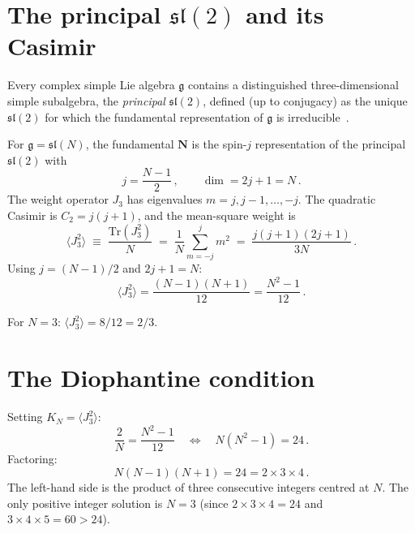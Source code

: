 \documentclass[final,3p,times,twocolumn]{elsarticle}
\newcommand{\Tr}{\mathrm{Tr}}
\begin{document}
\section{The principal $\mathfrak{sl}(2)$ and its Casimir}
\label{sec:sl2}

Every complex simple Lie algebra $\mathfrak{g}$ contains a
distinguished three-dimensional simple subalgebra, the
\emph{principal} $\mathfrak{sl}(2)$, defined (up to conjugacy)
as the unique $\mathfrak{sl}(2)$ for which the fundamental
representation of $\mathfrak{g}$ is
irreducible~\cite{Kostant:1959}.

For $\mathfrak{g} = \mathfrak{sl}(N)$, the fundamental
$\mathbf{N}$ is the spin-$j$ representation of the principal
$\mathfrak{sl}(2)$ with
\begin{equation}
  j = \frac{N-1}{2}\,,\qquad
  \dim = 2j + 1 = N\,.
\end{equation}
The weight operator $J_3$ has eigenvalues
$m = j, j{-}1, \ldots, -j$.
The quadratic Casimir is $C_2 = j(j+1)$, and the
mean-square weight is
\begin{equation}
  \langle J_3^2 \rangle
  \;\equiv\; \frac{\Tr(J_3^2)}{N}
  \;=\; \frac{1}{N}\sum_{m=-j}^{j} m^2
  \;=\; \frac{j(j+1)(2j+1)}{3N}\,.
  \label{eq:J3sq}
\end{equation}
Using $j = (N{-}1)/2$ and $2j{+}1 = N$:
\begin{equation}
  \langle J_3^2 \rangle
  = \frac{(N{-}1)(N{+}1)}{12}
  = \frac{N^2 - 1}{12}\,.
  \label{eq:J3sq_N}
\end{equation}

For $N = 3$: $\langle J_3^2 \rangle = 8/12 = 2/3$.


\section{The Diophantine condition}
\label{sec:diophantine}

Setting $K_N = \langle J_3^2 \rangle$:
\begin{equation}
  \frac{2}{N} = \frac{N^2 - 1}{12}
  \quad\Longleftrightarrow\quad
  N(N^2 - 1) = 24\,.
  \label{eq:diophantine}
\end{equation}
Factoring:
\begin{equation}
  N(N-1)(N+1) = 24 = 2 \times 3 \times 4\,.
\end{equation}
The left-hand side is the product of three consecutive integers
centred at $N$.
The only positive integer solution is
$\boxed{N = 3}$
(since $2 \times 3 \times 4 = 24$ and $3 \times 4 \times 5 = 60
> 24$).
\end{document}
